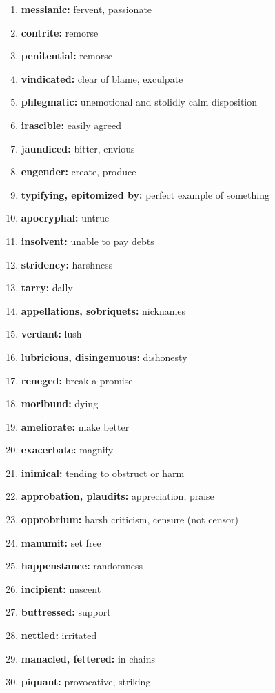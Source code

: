 \documentclass{article}
\begin{document}
\begin{enumerate}
    \item \textbf{messianic: }{fervent, passionate}
    \item \textbf{contrite: }{remorse}
    \item \textbf{penitential: }{remorse}
    \item \textbf{vindicated: }{clear of blame, exculpate}
    \item \textbf{phlegmatic: }{unemotional and stolidly calm disposition}
    \item \textbf{irascible: }{easily agreed}
    \item \textbf{jaundiced: }{bitter, envious}
    \item \textbf{engender: }{create, produce}
    \item \textbf{typifying, epitomized by: }{perfect example of something}
    \item \textbf{apocryphal: }{untrue}
    \item \textbf{insolvent: }{unable to pay debts}
    \item \textbf{stridency: }{harshness}
    \item \textbf{tarry: }{dally}
    \item \textbf{appellations, sobriquets: }{nicknames}
    \item \textbf{verdant: }{lush}
    \item \textbf{lubricious, disingenuous: }{dishonesty}
    \item \textbf{reneged: }{break a promise}
    \item \textbf{moribund: }{dying}
    \item \textbf{ameliorate: }{make better}
    \item \textbf{exacerbate: }{magnify}
    \item \textbf{inimical: }{tending to obstruct or harm}
    \item \textbf{approbation, plaudits: }{appreciation, praise}
    \item \textbf{opprobrium: }{harsh criticism, censure (not censor)}
    \item \textbf{manumit: }{set free}
    \item \textbf{happenstance: }{randomness}
    \item \textbf{incipient: }{nascent}
    \item \textbf{buttressed: }{support}
    \item \textbf{nettled: }{irritated}
    \item \textbf{manacled, fettered: }{in chains}
    \item \textbf{piquant: }{provocative, striking}

\end{enumerate}
\end{document}
